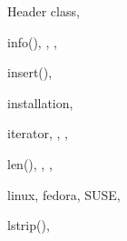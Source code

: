 \begin{theindex}
  \indexspace

  \item Header class, 

  \indexspace

  \item info(), , , 
  \item insert(), 
  \item installation, 
  \item iterator, , , 

  \indexspace

  \item len(), , , 
  \item linux, 
    \subitem fedora, 
    \subitem SUSE, 
  \item lstrip(), 

  \indexspace


\end{theindex}
